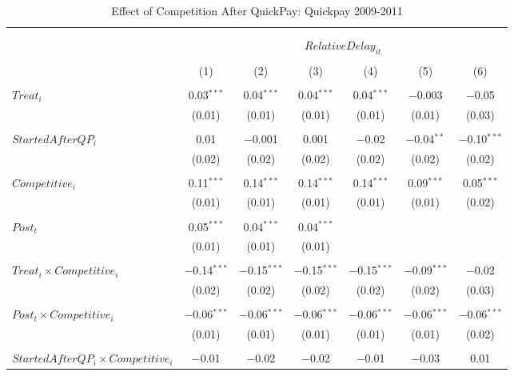\documentclass[
]{article}
\begin{document}
\begin{table}[H] \centering 
  \caption{Effect of Competition After QuickPay: Quickpay 2009-2011} 
  \label{} 
\small 
\begin{tabular}{@{\extracolsep{-3pt}}lcccccc} 
\\[-1.8ex]\hline 
\hline \\[-1.8ex] 
\\[-1.8ex] & \multicolumn{6}{c}{$RelativeDelay_{it}$  } \\ 
\\[-1.8ex] & (1) & (2) & (3) & (4) & (5) & (6)\\ 
\hline \\[-1.8ex] 
 $Treat_i$ & 0.03$^{***}$ & 0.04$^{***}$ & 0.04$^{***}$ & 0.04$^{***}$ & $-$0.003 & $-$0.05 \\ 
  & (0.01) & (0.01) & (0.01) & (0.01) & (0.01) & (0.03) \\ 
  & & & & & & \\ 
 $StartedAfterQP_i$ & 0.01 & $-$0.001 & 0.001 & $-$0.02 & $-$0.04$^{**}$ & $-$0.10$^{***}$ \\ 
  & (0.02) & (0.02) & (0.02) & (0.02) & (0.02) & (0.02) \\ 
  & & & & & & \\ 
 $Competitive_i$ & 0.11$^{***}$ & 0.14$^{***}$ & 0.14$^{***}$ & 0.14$^{***}$ & 0.09$^{***}$ & 0.05$^{***}$ \\ 
  & (0.01) & (0.01) & (0.01) & (0.01) & (0.01) & (0.02) \\ 
  & & & & & & \\ 
 $Post_t$ & 0.05$^{***}$ & 0.04$^{***}$ & 0.04$^{***}$ &  &  &  \\ 
  & (0.01) & (0.01) & (0.01) &  &  &  \\ 
  & & & & & & \\ 
 $Treat_i \times Competitive_i$ & $-$0.14$^{***}$ & $-$0.15$^{***}$ & $-$0.15$^{***}$ & $-$0.15$^{***}$ & $-$0.09$^{***}$ & $-$0.02 \\ 
  & (0.02) & (0.02) & (0.02) & (0.02) & (0.02) & (0.03) \\ 
  & & & & & & \\ 
 $Post_t \times Competitive_i$ & $-$0.06$^{***}$ & $-$0.06$^{***}$ & $-$0.06$^{***}$ & $-$0.06$^{***}$ & $-$0.06$^{***}$ & $-$0.06$^{***}$ \\ 
  & (0.01) & (0.01) & (0.01) & (0.01) & (0.01) & (0.02) \\ 
  & & & & & & \\ 
 $StartedAfterQP_i \times Competitive_i$ & $-$0.01 & $-$0.02 & $-$0.02 & $-$0.01 & $-$0.03 & 0.01 \\ 

\end{tabular}
\end{table}
\end{document}

